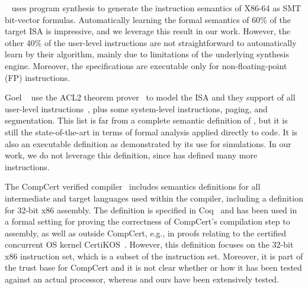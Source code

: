 \Strata~\cite{Heule2016a} uses program synthesis to generate the instruction
semantics of X86-64 as SMT bit-vector formulas. Automatically learning the formal semantics of 60\% of the target \ISA ISA
is impressive, and we leverage this result in our work.  However, the other 40\% of the
user-level instructions are not straightforward to automatically learn by their algorithm, mainly due to limitations of the underlying synthesis engine.  Moreover, the specifications are executable only for non-floating-point (FP) instructions.


Goel \etal~\cite{Goel:FMCAD14} use the ACL2 theorem prover~\cite{ACL2:Kaufmann2000} to model the \ISA ISA and they support
\goelPerc{} of all user-level instructions~\cite{GoelList}, plus some system-level instructions, paging, and
segmentation.  This list is far from a complete semantic definition of \ISA,
but it is still the state-of-the-art in terms of formal analysis applied
directly to \ISA code. It is also an executable definition as demonstrated by
its use for simulations. In our work, we do not leverage this definition, since
\Strata has defined many more instructions.

The CompCert verified compiler~\cite{Leroy:2009} includes semantics
definitions for all intermediate and target languages used within the compiler,
including a definition for 32-bit x86 assembly. The definition is specified in Coq~\cite{Coq} and has been used in a formal
setting for proving the correctness of CompCert's compilation step to assembly,
as well as outside CompCert, e.g., in proofs relating to the certified concurrent
OS kernel CertiKOS~\cite{Gu:2016}. However, this definition focuses on the
32-bit x86 instruction set, which is a subset of the \ISA instruction 
set.
Moreover, it is part of the trust base for CompCert and it is not clear
whether or how it has been tested against an actual processor, whereas
\Strata and ours have been extensively tested.

